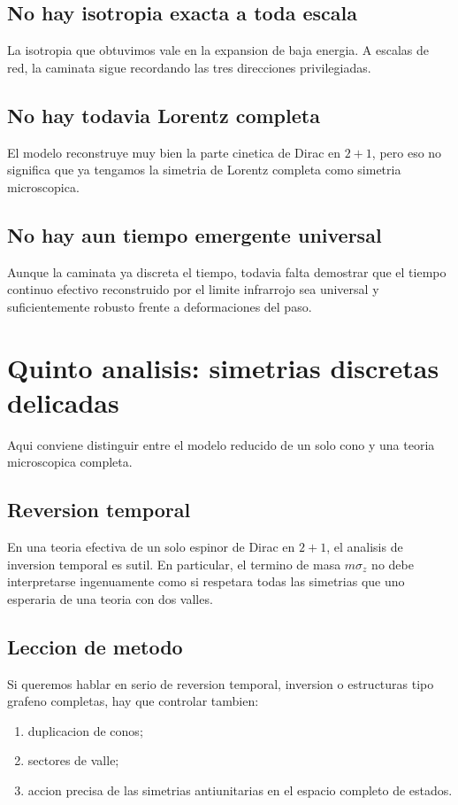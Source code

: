 \subsection{No hay isotropia exacta a toda escala}
La isotropia que obtuvimos vale en la expansion de baja energia. A escalas de red, la caminata sigue recordando las tres direcciones privilegiadas.

\subsection{No hay todavia Lorentz completa}
El modelo reconstruye muy bien la parte cinetica de Dirac en \(2+1\), pero eso no significa que ya tengamos la simetria de Lorentz completa como simetria microscopica.

\subsection{No hay aun tiempo emergente universal}
Aunque la caminata ya discreta el tiempo, todavia falta demostrar que el tiempo continuo efectivo reconstruido por el limite infrarrojo sea universal y suficientemente robusto frente a deformaciones del paso.

\section{Quinto analisis: simetrias discretas delicadas}
Aqui conviene distinguir entre el modelo reducido de un solo cono y una teoria microscopica completa.

\subsection{Reversion temporal}
En una teoria efectiva de un solo espinor de Dirac en \(2+1\), el analisis de inversion temporal es sutil. En particular, el termino de masa \(m\sigma_z\) no debe interpretarse ingenuamente como si respetara todas las simetrias que uno esperaria de una teoria con dos valles.

\subsection{Leccion de metodo}
Si queremos hablar en serio de reversion temporal, inversion o estructuras tipo grafeno completas, hay que controlar tambien:
\begin{enumerate}[label=\arabic*.]
    \item duplicacion de conos;
    \item sectores de valle;
    \item accion precisa de las simetrias antiunitarias en el espacio completo de estados.
\end{enumerate}

